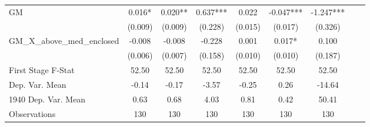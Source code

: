 \begin{tabular}{l*{8}{c}}
\cmidrule(lr){1-7}
GM              &    0.016*  &    0.020** &    0.637***&    0.022   &   -0.047***&   -1.247***\\
                &  (0.009)   &  (0.009)   &  (0.228)   &  (0.015)   &  (0.017)   &  (0.326)   \\
\addlinespace
GM\_X\_above\_med\_enclosed&   -0.008   &   -0.008   &   -0.228   &    0.001   &    0.017*  &    0.100   \\
                &  (0.006)   &  (0.007)   &  (0.158)   &  (0.010)   &  (0.010)   &  (0.187)   \\
\midrule
First Stage F-Stat&    52.50   &    52.50   &    52.50   &    52.50   &    52.50   &    52.50   \\
Dep. Var. Mean  &    -0.14   &    -0.17   &    -3.57   &    -0.25   &     0.26   &   -14.64   \\
1940 Dep. Var. Mean&     0.63   &     0.68   &     4.03   &     0.81   &     0.42   &    50.41   \\
Observations    &      130   &      130   &      130   &      130   &      130   &      130   \\
       \bottomrule \end{tabular}
